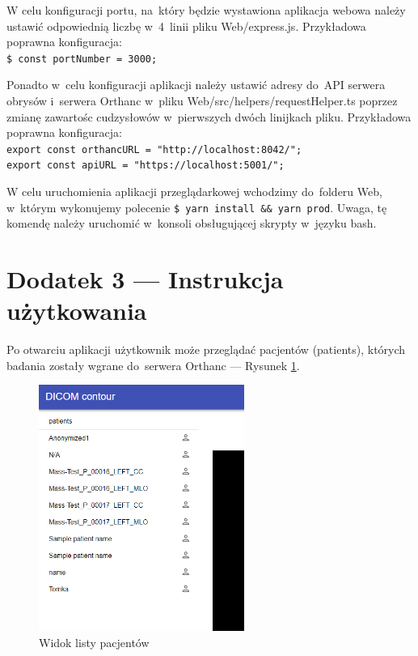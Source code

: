 \documentclass[a4paper,11pt,twoside,openright]{report}
\theoremstyle{definition}
\begin{document}
W celu konfiguracji portu, na~który będzie wystawiona aplikacja webowa należy
ustawić odpowiednią liczbę w~4~linii pliku Web/express.js. Przykładowa poprawna
konfiguracja:\\
\texttt{\$ const portNumber = 3000;}

Ponadto w~celu konfiguracji aplikacji należy ustawić adresy do~API serwera obrysów
i~serwera Orthanc w~pliku Web/src/helpers/requestHelper.ts poprzez zmianę zawartośc
cudzysłowów w~pierwszych dwóch linijkach pliku. 	Przykładowa poprawna konfiguracja:\\
\texttt{export const orthancURL = "http://localhost:8042/";}\\
\texttt{export const apiURL = "https://localhost:5001/";}

W celu uruchomienia aplikacji przeglądarkowej wchodzimy do~folderu Web, w~którym
wykonujemy polecenie \texttt{\$ yarn install \&\& yarn prod}. Uwaga, tę komendę
należy uruchomić w~konsoli obsługującej skrypty w~języku bash.




\newpage
\chapter*{Dodatek 3 --- Instrukcja użytkowania}

Po otwarciu aplikacji użytkownik może przeglądać pacjentów (patients), których
badania zostały wgrane do~serwera Orthanc --- Rysunek \ref{fig:1}.

\begin{figure}[h!]
	\center
	\includegraphics[width=0.6\textwidth]{1}
	\caption{Widok listy pacjentów}
    	\label{fig:1}
\end{figure}
\end{document}
